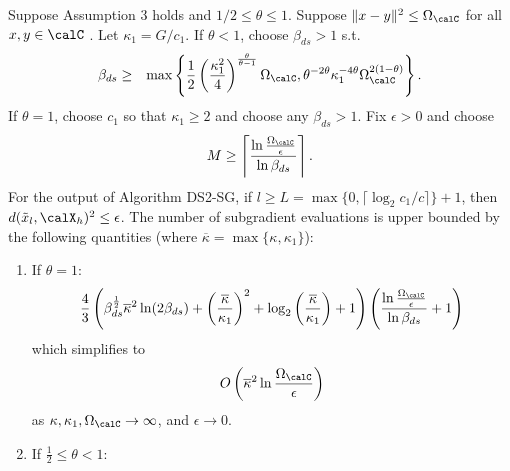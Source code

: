 \begin{theorem}
\label{thmAdapt} Suppose Assumption 3 holds and $1/2\leq\theta\leq 1$. Suppose $\|x-y\|^2\leq \Omega_{\calC}$ for all $x,y\in\calC$ . Let $\kappa_1=G/c_1$.
If $\theta<1$, choose $\beta_{ds}>1$ s.t.
\begin{eqnarray}\label{beta_bound_2_1}
\beta_{ds}&\geq& 
\max\left\{\frac{1}{2}
\left(\frac{\kappa_1^2}{4}\right)^{\frac{\theta}{\theta-1}}\Omega_\calC,
\theta^{-2\theta}\kappa_1^{-4\theta}\Omega_\calC^{2(1-\theta)}
\right\}.
\end{eqnarray}
If $\theta=1$, choose $c_1$ so that $\kappa_1\geq 2$ and choose any $\beta_{ds}>1$.
Fix $\epsilon>0$ and choose 
\begin{eqnarray}\label{Mreq}
M\geq\left\lceil\frac{\ln\frac{\Omega_{\calC}}{\epsilon}}{\ln\beta_{ds}}\right\rceil.
\end{eqnarray}
For the output of Algorithm DS2-SG, if $l\geq L= \max\{0,\lceil\log_2 c_1/c\rceil\}+1$, then $d(\tilde{x}_l,\calX_h)^2\leq\epsilon$. The number of subgradient evaluations is upper bounded by the following quantities (where $\overline{\kappa}=\max\{\kappa,\kappa_1\}$):
\begin{enumerate}
	\item If $\theta=1$:
\begin{eqnarray}
\frac{4}{3}\left(\beta_{ds}^{\frac{1}{2}} \overline{\kappa}^2 \ln(2\beta_{ds})+\left(\frac{\overline{\kappa}}{\kappa_1}\right)^2
+
\log_2\left(\frac{\overline{\kappa}}{\kappa_1}\right)+1
\right)
\left(\frac{\ln\frac{\Omega_{\calC}}{\epsilon}}{\ln\beta_{ds}}+1\right)
\label{adaptIterComp1}
\end{eqnarray}
which simplifies to
\begin{eqnarray*}
O\left(\overline{\kappa}^2\ln\frac{\Omega_{\calC}}{\epsilon}\right)
\end{eqnarray*}
as $\kappa,\kappa_1,\Omega_{\calC}\to\infty$, and $\epsilon\to 0$. 
\item 
If $\frac{1}{2}\leq \theta<1$:
\begin{align}\label{adaptIterComp2}

\end{align}
\end{enumerate}
\end{theorem}
